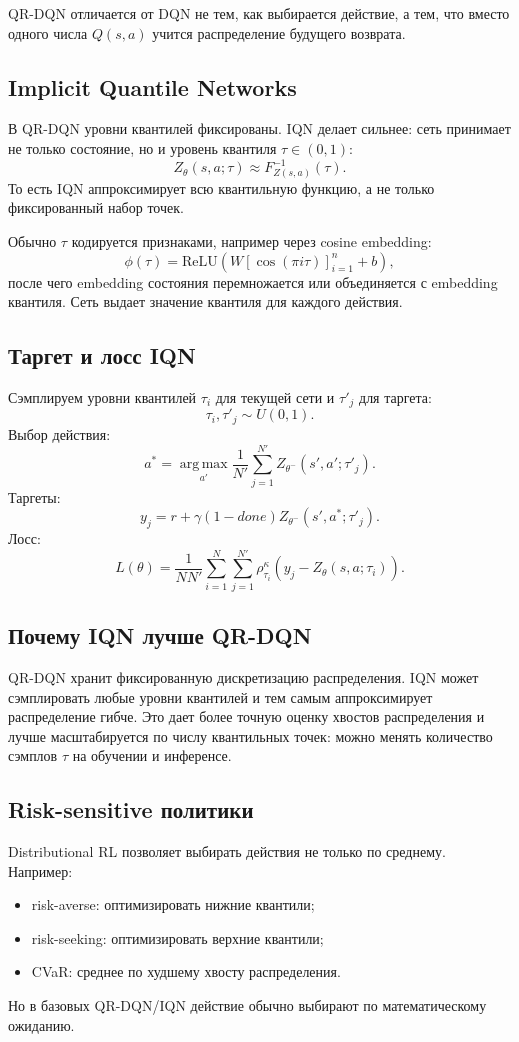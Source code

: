 \documentclass[11pt,a4paper]{article}
\newcommand{\argmax}{\operatorname*{arg\,max}}
\newcommand{\1}{\mathbf{1}}
\begin{document}
QR-DQN отличается от DQN не тем, как выбирается действие, а тем, что вместо одного числа $Q(s,a)$ учится распределение будущего возврата.

\subsection*{Implicit Quantile Networks}
В QR-DQN уровни квантилей фиксированы. IQN делает сильнее: сеть принимает не только состояние, но и уровень квантиля $\tau\in(0,1)$:
\[
    Z_\theta(s,a;\tau)\approx F^{-1}_{Z(s,a)}(\tau).
\]
То есть IQN аппроксимирует всю квантильную функцию, а не только фиксированный набор точек.

Обычно $\tau$ кодируется признаками, например через cosine embedding:
\[
    \phi(\tau)=\mathrm{ReLU}\left(W[\cos(\pi i\tau)]_{i=1}^n+b\right),
\]
после чего embedding состояния перемножается или объединяется с embedding квантиля. Сеть выдает значение квантиля для каждого действия.

\subsection*{Таргет и лосс IQN}
Сэмплируем уровни квантилей $\tau_i$ для текущей сети и $\tau'_j$ для таргета:
\[
    \tau_i,\tau'_j\sim U(0,1).
\]
Выбор действия:
\[
    a^*=\argmax_{a'}\frac1{N'}\sum_{j=1}^{N'}Z_{\theta^-}(s',a';\tau'_j).
\]
Таргеты:
\[
    y_j=r+\gamma(1-done)Z_{\theta^-}(s',a^*;\tau'_j).
\]
Лосс:
\[
    L(\theta)=\frac1{NN'}\sum_{i=1}^N\sum_{j=1}^{N' }
    \rho_{\tau_i}^\kappa\left(y_j-Z_\theta(s,a;\tau_i)\right).
\]

\subsection*{Почему IQN лучше QR-DQN}
QR-DQN хранит фиксированную дискретизацию распределения. IQN может сэмплировать любые уровни квантилей и тем самым аппроксимирует распределение гибче. Это дает более точную оценку хвостов распределения и лучше масштабируется по числу квантильных точек: можно менять количество сэмплов $\tau$ на обучении и инференсе.

\subsection*{Risk-sensitive политики}
Distributional RL позволяет выбирать действия не только по среднему. Например:
\begin{itemize}
    \item risk-averse: оптимизировать нижние квантили;
    \item risk-seeking: оптимизировать верхние квантили;
    \item CVaR: среднее по худшему хвосту распределения.
\end{itemize}
Но в базовых QR-DQN/IQN действие обычно выбирают по математическому ожиданию.
\end{document}
